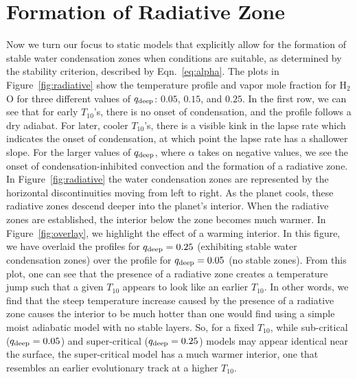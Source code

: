 \documentclass[11pt]{ucscthesisbs}
\begin{document}
\section{Formation of Radiative Zone}
Now we turn our focus to static models that explicitly allow for the formation of stable water condensation zones when conditions are suitable, as determined by the stability criterion, described by Eqn.~\ref{eq:alpha}. The plots in Figure~\ref{fig:radiative} show the temperature profile and vapor mole fraction for H$_{2}$O for three different values of $q_{\rm deep}$: $0.05$, $0.15$, and $0.25$. In the first row, we can see that for early $T_{10}$'s, there is no onset of condensation, and the profile follows a dry adiabat. For later, cooler $T_{10}$'s, there is a visible kink in the lapse rate which indicates the onset of condensation, at which point the lapse rate has a shallower slope. For the larger values of $q_{\rm deep}$, where $\alpha$ takes on negative values, we see the onset of condensation-inhibited convection and the formation of a radiative zone. In Figure~\ref{fig:radiative} the water condensation zones are represented by the horizontal discontinuities moving from left to right. As the planet cools, these radiative zones descend deeper into the planet's interior. When the radiative zones are established, the interior below the zone becomes much warmer. In Figure~\ref{fig:overlay}, we highlight the effect of a warming interior. In this figure, we have overlaid the profiles for $q_{\rm deep} = 0.25$ (exhibiting stable water condensation zones) over the profile for $q_{\rm deep}=0.05$ (no stable zones). From this plot, one can see that the presence of a radiative zone creates a temperature jump such that a given $T_{10}$ appears to look like an earlier $T_{10}$. In other words, we find that the steep temperature increase caused by the presence of a radiative zone causes the interior to be much hotter than one would find using a simple moist adiabatic model with no stable layers. So, for a fixed $T_{10}$, while sub-critical ($q_{\rm deep} = 0.05$) and super-critical ($q_{\rm deep} = 0.25$) models may appear identical near the surface, the super-critical model has a much warmer interior, one that resembles an earlier evolutionary track at a higher $T_{10}$.
\end{document}
